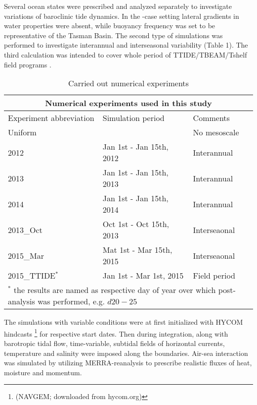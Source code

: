 \documentclass[12pt]{article}
\begin{document}
Several ocean states were prescribed and analyzed separately to investigate variations of 
baroclinic tide dynamics. In the -case setting lateral gradients in water properties 
were 
absent, 
while buoyancy frequency was set to be representative of the Tasman Basin. The second type of 
simulations was performed to investigate interannual and interseasonal variability (Table 1). The 
third calculation was intended to cover whole period of TTIDE/TBEAM/Tshelf field programs 
\citep{pinkel2015breaking}.
\begin{table}
	\caption{Carried out numerical experiments}
	\begin{tabular}{ |p{3cm}||p{5cm}|p{5cm}|  }
		\hline
		\multicolumn{3}{|c|}{Numerical experiments used in this study} \\
		\hline
		Experiment abbreviation & Simulation period & Comments \\
		\hline
		Uniform & ~ & No mesoscale \\
		2012 &   Jan 1st - Jan 15th, 2012 & Interannual \\
		2013 &   Jan 1st - Jan 15th, 2013 & Interannual \\
		2014 &   Jan 1st - Jan 15th, 2014 & Interannual \\
		2013\_Oct &   Oct 1st - Oct 15th, 2013 & Interseaonal \\
		2015\_Mar &   Mat 1st - Mar 15th, 2015 & Interseaonal \\
		2015\_TTIDE$^{\ast}$ &   Jan 1st - Mar 1st, 2015 & Field period \\
		\hline
		\multicolumn{3}{|l|}{\footnotesize$^{\ast}$ the results are named as respective day of 
		year over which post-analysis was performed, e.g. $d20-25$ }\\
		\hline
	\end{tabular}
	\label{ch2:table_exp}
\end{table}
The simulations with variable conditions were at first initialized with HYCOM hindcasts
\footnote{(NAVGEM;	downloaded from hycom.org)} for respective start dates. Then during 
integration, 
along with barotropic tidal flow, time-variable, subtidal fields 
of horizontal currents, temperature and salinity were imposed along the 
boundaries. Air-sea interaction was simulated by utilizing MERRA-reanalysis 
\citep{rienecker2011merra} to prescribe realistic fluxes of heat, moisture and momentum.
\end{document}

